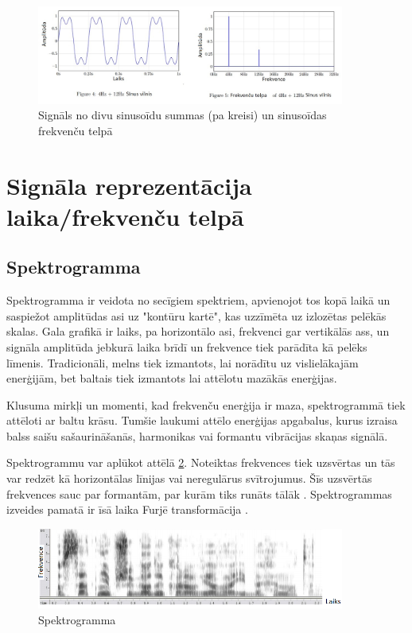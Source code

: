 \documentclass[12pt,paper=A4]{report}
\begin{document}
\begin{figure}[H] \centering
\includegraphics[width=0.90\textwidth]{timeAndFrequencyDomain} 
\caption{Signāls no divu sinusoīdu summas (pa kreisi) un sinusoīdas frekvenču telpā  \cite{http://www.theparticle.com/cs/bc/mcs/signalnotes.pdf}}  \label{time-frequency-signal} 
\end{figure}
  
\FloatBarrier
\section{Signāla reprezentācija laika/frekvenču telpā}
\subsection{Spektrogramma}


Spektrogramma ir veidota no secīgiem spektriem, apvienojot tos kopā laikā un saspiežot amplitūdas asi uz "kontūru kartē", kas uzzīmēta uz izlozētas
pelēkās skalas. 
Gala grafikā ir laiks, pa horizontālo asi, frekvenci gar
vertikālās ass, un signāla amplitūda jebkurā laika brīdī un frekvence tiek parādīta kā
pelēks līmenis. Tradicionāli, melns tiek izmantots, lai norādītu uz vislielākajām enerģijām, bet baltais tiek izmantots
lai attēlotu mazākās enerģijas.

Klusuma mirkļi un momenti, kad frekvenču enerģija ir maza, spektrogrammā tiek attēloti ar baltu krāsu. Tumšie laukumi attēlo enerģijas apgabalus, kurus 
izraisa balss saišu sašaurināšanās, harmonikas vai formantu vibrācijas skaņas signālā.  \cite{dtw21}

Spektrogrammu var aplūkot attēlā \ref{spectogram-gray}. Noteiktas frekvences tiek uzsvērtas un tās var redzēt kā horizontālas līnijas vai neregulārus svītrojumus. Šīs uzsvērtās frekvences sauc par formantām, par kurām tiks runāts tālāk \cite{Acoustic}.
Spektrogrammas izveides pamatā ir īsā laika Furjē transformācija \cite{dtw22}.

\begin{figure}[H] \centering
\includegraphics[width=0.90\textwidth]{spectogramm} 
\caption{ Spektrogramma \cite{Acoustic}}  \label{spectogram-gray} 
\end{figure}
\end{document}

